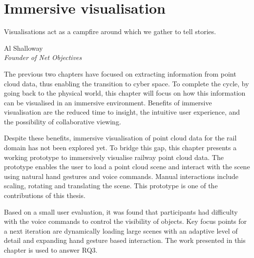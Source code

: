\chapter{Immersive visualisation}\label{chap:immvis}
\epigraph{Visualisations act as a campfire around which we gather to tell stories.}{Al Shalloway\\\textit{Founder of Net Objectives}}

The previous two chapters have focused on extracting information from point cloud data, thus enabling the transition to cyber space. To complete the cycle, by going back to the physical world, this chapter will focus on how this information can be visualised in an immersive environment. Benefits of immersive visualisation are the reduced time to insight, the intuitive user experience, and the possibility of collaborative viewing.

Despite these benefits, immersive visualisation of point cloud data for the rail domain has not been explored yet. To bridge this gap, this chapter presents a working prototype to immersively visualise railway point cloud data. The prototype enables the user to load a point cloud scene and interact with the scene using natural hand gestures and voice commands. Manual interactions include scaling, rotating and translating the scene. This prototype is one of the contributions of this thesis.

Based on a small user evaluation, it was found that participants had difficulty with the voice commands to control the visibility of objects. Key focus points for a next iteration are dynamically loading large scenes with an adaptive level of detail and expanding hand gesture based interaction. The work presented in this chapter is used to answer RQ3.

\clearpage


\clearpage
\printbibliography[heading=subbibnumbered]